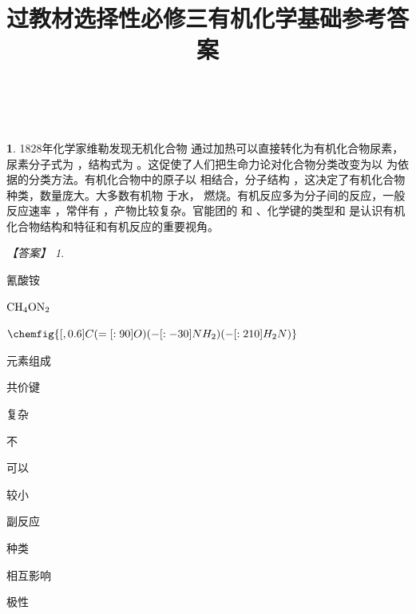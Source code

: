 \documentclass[UTF8, 10pt, a4paper, oneside]{ctexart}
\title{\vspace{-2em}过教材\quad 选择性必修三\quad 有机化学基础\quad 参考答案\vspace{-2em}}
\author{}
\date{\textcolor{white}{\today}\vspace{-3em}}
\newcommand{\blank}{ \underbar{\quad$\blacktriangle$\quad} }%
\theoremstyle{definition}
\newtheorem{exercise}{}
\theoremstyle{remark}
\newtheorem*{answer}{【答案】}
\theoremstyle{plain}
\begin{document}
\maketitle

\begin{exercise}
    1828年化学家维勒发现无机化合物\blank 通过加热可以直接转化为有机化合物尿素，尿素分子式为\blank ，结构式为\blank 。这促使了人们把生命力论对化合物分类改变为以\blank 为依据的分类方法。有机化合物中的原子以\blank 相结合，分子结构\blank，这决定了有机化合物种类，数量庞大。大多数有机物\blank 于水，\blank 燃烧。有机反应多为分子间的反应，一般反应速率\blank ，常伴有\blank ，产物比较复杂。官能团的\blank 和\blank、化学键的类型和\blank 是认识有机化合物结构和特征和有机反应的重要视角。
    \begin{answer}
        \begin{inparaenum}
            \item[\setcounter{enumi}{1}\textsuperscript{\arabic{enumi}}] 氰酸铵
            \item $\ce{CH4ON2}$
            \item $\chemfig{[,0.6] C(=[:90]O)(-[:-30]NH_2)(-[:210]H_2N)}$
            \item 元素组成
            \item 共价键
            \item 复杂
            \item 不
            \item 可以
            \item 较小
            \item 副反应
            \item 种类
            \item 相互影响
            \item 极性
        \end{inparaenum}
    \end{answer}
\end{exercise}
\end{document}
